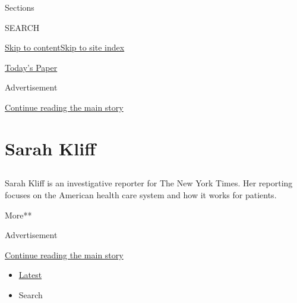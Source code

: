 Sections

SEARCH

\protect\hyperlink{site-content}{Skip to
content}\protect\hyperlink{site-index}{Skip to site index}

\href{https://myaccount.nytimes.com/auth/login?response_type=cookie\&client_id=vi}{}

\href{https://www.nytimes.com/section/todayspaper}{Today's Paper}

Advertisement

\protect\hyperlink{after-top}{Continue reading the main story}

\hypertarget{sarah-kliff}{%
\section{Sarah Kliff}\label{sarah-kliff}}

\subsection{}

Sarah Kliff is an investigative reporter for The New York Times. Her
reporting focuses on the American health care system and how it works
for patients.~

More**

Advertisement

\protect\hyperlink{after-mid1}{Continue reading the main story}

\begin{itemize}
\tightlist
\item
  \protect\hyperlink{stream-panel}{Latest}
\item
  Search
\end{itemize}

